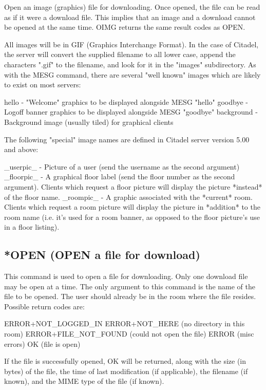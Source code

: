  Open an image (graphics) file for downloading.  Once opened, the file can be
read as if it were a download file.  This implies that an image and a download
cannot be opened at the same time.  OIMG returns the same result codes as OPEN.

 All images will be in GIF (Graphics Interchange Format).  In the case of
Citadel, the server will convert the supplied filename to all lower case,
append the characters ".gif" to the filename, and look for it in the "images"
subdirectory.  As with the MESG command, there are several "well known"
images which are likely to exist on most servers:

 hello        - "Welcome" graphics to be displayed alongside MESG "hello"
 goodbye      - Logoff banner graphics to be displayed alongside MESG "goodbye"
 background   - Background image (usually tiled) for graphical clients

 The following "special" image names are defined in Citadel server version
5.00 and above:

 _userpic_    - Picture of a user (send the username as the second argument)
 _floorpic_   - A graphical floor label (send the floor number as the second
                argument).  Clients which request a floor picture will display
                the picture *instead* of the floor name.
 _roompic_    - A graphic associated with the *current* room.  Clients which
                request a room picture will display the picture in *addition*
                to the room name (i.e. it's used for a room banner, as
                opposed to the floor picture's use in a floor listing).



\subsection{*OPEN (OPEN a file for download)}

 This command is used to open a file for downloading.  Only one download
file may be open at a time.  The only argument to this command is the name
of the file to be opened.  The user should already be in the room where the
file resides.  Possible return codes are:

 ERROR+NOT_LOGGED_IN
 ERROR+NOT_HERE                (no directory in this room)
 ERROR+FILE_NOT_FOUND          (could not open the file)
 ERROR                         (misc errors)
 OK                            (file is open)

 If the file is successfully opened, OK will be returned, along with the
size (in bytes) of the file, the time of last modification (if applicable),
the filename (if known), and the MIME type of the file (if known).



